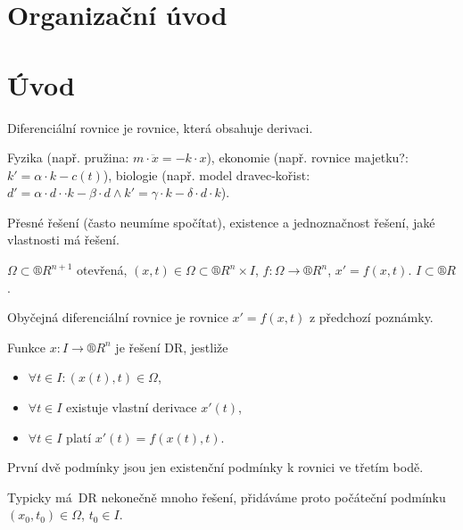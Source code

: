 \documentclass[12pt]{article}					%
\begin{document}
\section*{Organizační úvod}
\begin{poznamka}
\end{poznamka}

\section{Úvod}
\begin{definice}
	Diferenciální rovnice je rovnice, která obsahuje derivaci.
\end{definice}

\begin{poznamka}[Motivace]
	Fyzika (např. pružina: $m·\ddot{x} = -k·x$), ekonomie (např. rovnice majetku?: $k' = \alpha·k - c(t)$), biologie (např. model dravec-kořist: $d' = \alpha·d··k - \beta·d \land k' = \gamma·k - \delta·d·k$).
\end{poznamka}

\begin{poznamka}
	Přesné řešení (často neumíme spočítat), existence a jednoznačnost řešení, jaké vlastnosti má řešení.
\end{poznamka}

\begin{poznamka}[Předpoklady]
	$\Omega \subset ®R^{n + 1}$ otevřená, $(x, t) \in \Omega \subset ®R^n \times I$, $f: \Omega \rightarrow ®R^n$, $x' = f(x, t)$. $I \subset ®R$.
\end{poznamka}

\begin{definice}
	Obyčejná diferenciální rovnice je rovnice $x' = f(x, t)$ z předchozí poznámky.

	Funkce $x: I \rightarrow ®R^n$ je řešení DR, jestliže
	\begin{itemize}
		\item $\forall t \in I: (x(t), t) \in \Omega$,
		\item $\forall t \in I$ existuje vlastní derivace $x'(t)$,
		\item $\forall t \in I$ platí $x'(t) = f(x(t), t)$.
	\end{itemize}

	\begin{poznamkain}
		První dvě podmínky jsou jen existenční podmínky k rovnici ve třetím bodě.
	\end{poznamkain}

	Typicky má DR nekonečně mnoho řešení, přidáváme proto počáteční podmínku $(x_0, t_0) \in \Omega$, $t_0 \in I$.
\end{definice}
\end{document}
